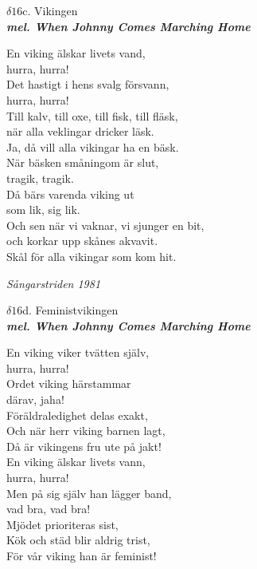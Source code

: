 \documentclass[a6paper,10pt]{article}
\newcommand{\mel}[1]{\small\textbf{\textit{mel. #1 \\}}}
\begin{document}
\newpage
\setlength{\oddsidemargin}{-0.47in}
\noindent
\begin{center}
\Large $\delta16$c. Vikingen\\ 
\mel{When Johnny Comes Marching Home}
\end{center}
En viking älskar livets vand, \\
hurra, hurra! \\
Det hastigt i hens svalg försvann, \\
hurra, hurra! \\
Till kalv, till oxe, till fisk, till fläsk, \\
när alla veklingar dricker läsk. \\
Ja, då vill alla vikingar ha en bäsk. 
\vspace{5pt}\\
När bäsken småningom är slut, \\
tragik, tragik. \\
Då bärs varenda viking ut \\
som lik, sig lik. \\
Och sen när vi vaknar, vi sjunger en bit, \\
och korkar upp skånes akvavit. \\
Skål för alla vikingar som kom hit. 
\begin{flushright}
\textit{Sångarstriden 1981}
\end{flushright}
\newpage\setlength{\oddsidemargin}{-0.37in}
\begin{center}
\Large $\delta16$d. Feministvikingen\\ 
\mel{When Johnny Comes Marching Home}
\end{center}
En viking viker tvätten själv,\\
hurra, hurra!\\ 
Ordet viking härstammar\\ 
därav, jaha!\\ 
Föräldraledighet delas exakt, \\
Och när herr viking barnen lagt,\\ 
Då är vikingens fru ute på jakt! 
\vspace{5pt}\\
En viking älskar livets vann,\\
hurra, hurra! \\
Men på sig själv han lägger band,\\
vad bra, vad bra! \\
Mjödet prioriteras sist,\\
Kök och städ blir aldrig trist,\\ 
För vår viking han är feminist! 
\end{document}
